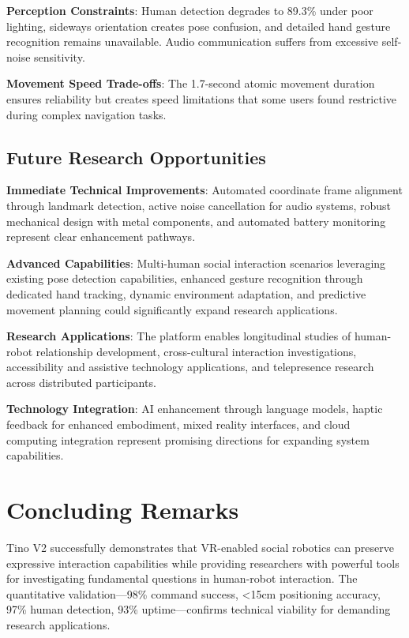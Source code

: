 \textbf{Perception Constraints}: Human detection degrades to 89.3\% under poor lighting, sideways orientation creates pose confusion, and detailed hand gesture recognition remains unavailable. Audio communication suffers from excessive self-noise sensitivity.

\textbf{Movement Speed Trade-offs}: The 1.7-second atomic movement duration ensures reliability but creates speed limitations that some users found restrictive during complex navigation tasks.

\subsection{Future Research Opportunities}

\textbf{Immediate Technical Improvements}: Automated coordinate frame alignment through landmark detection, active noise cancellation for audio systems, robust mechanical design with metal components, and automated battery monitoring represent clear enhancement pathways.

\textbf{Advanced Capabilities}: Multi-human social interaction scenarios leveraging existing pose detection capabilities, enhanced gesture recognition through dedicated hand tracking, dynamic environment adaptation, and predictive movement planning could significantly expand research applications.

\textbf{Research Applications}: The platform enables longitudinal studies of human-robot relationship development, cross-cultural interaction investigations, accessibility and assistive technology applications, and telepresence research across distributed participants.

\textbf{Technology Integration}: AI enhancement through language models, haptic feedback for enhanced embodiment, mixed reality interfaces, and cloud computing integration represent promising directions for expanding system capabilities.

\section{Concluding Remarks}

Tino V2 successfully demonstrates that VR-enabled social robotics can preserve expressive interaction capabilities while providing researchers with powerful tools for investigating fundamental questions in human-robot interaction. The quantitative validation—98\% command success, <15cm positioning accuracy, 97\% human detection, 93\% uptime—confirms technical viability for demanding research applications.

